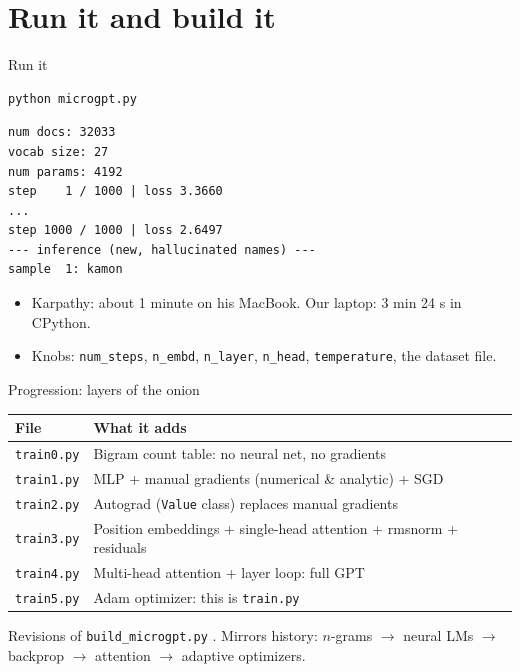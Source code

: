 \documentclass[aspectratio=169,11pt]{beamer}
\begin{document}
\section{Run it and build it}
\begin{frame}[fragile]{Run it}
\begin{lstlisting}[language=bash]
python microgpt.py
\end{lstlisting}
\begin{lstlisting}[language={}]
num docs: 32033
vocab size: 27
num params: 4192
step    1 / 1000 | loss 3.3660
...
step 1000 / 1000 | loss 2.6497
--- inference (new, hallucinated names) ---
sample  1: kamon
\end{lstlisting}
\begin{itemize}
  \item Karpathy: about 1 minute on his MacBook. Our laptop: 3 min 24 s in CPython.
  \item Knobs: \texttt{num\_steps}, \texttt{n\_embd}, \texttt{n\_layer}, \texttt{n\_head}, \texttt{temperature}, the dataset file.
\end{itemize}
\end{frame}

\begin{frame}{Progression: layers of the onion}
\centering
\begin{tabular}{@{}ll@{}}
\toprule
File & What it adds \\
\midrule
\texttt{train0.py} & Bigram count table: no neural net, no gradients \\
\texttt{train1.py} & MLP + manual gradients (numerical \& analytic) + SGD \\
\texttt{train2.py} & Autograd (\texttt{Value} class) replaces manual gradients \\
\texttt{train3.py} & Position embeddings + single-head attention + rmsnorm + residuals \\
\texttt{train4.py} & Multi-head attention + layer loop: full GPT \\
\texttt{train5.py} & Adam optimizer: this is \texttt{train.py} \\
\bottomrule
\end{tabular}
\vfill
Revisions of \texttt{build\_microgpt.py} \parencite{karpathy2026buildmicrogpt}. Mirrors history: $n$-grams $\to$ neural LMs $\to$ backprop $\to$ attention $\to$ adaptive optimizers.
\end{frame}
\end{document}
